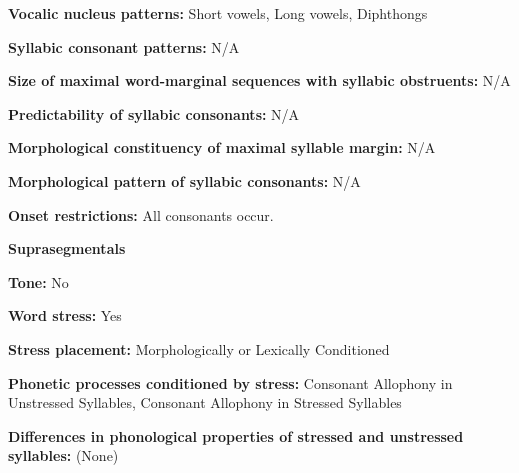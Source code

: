 \begin{styleBody}
\textbf{Vocalic nucleus patterns:} Short vowels, Long vowels, Diphthongs
\end{styleBody}

\begin{styleBody}
\textbf{Syllabic consonant patterns:} N/A
\end{styleBody}

\begin{styleBody}
\textbf{Size of maximal word{}-marginal sequences with syllabic obstruents:} N/A
\end{styleBody}

\begin{styleBody}
\textbf{Predictability of syllabic consonants:} N/A
\end{styleBody}

\begin{styleBody}
\textbf{Morphological constituency of maximal syllable margin:} N/A
\end{styleBody}

\begin{styleBody}
\textbf{Morphological pattern of syllabic consonants:} N/A
\end{styleBody}

\begin{styleBody}
\textbf{Onset restrictions: }All consonants occur.
\end{styleBody}

\begin{styleBody}
\textbf{Suprasegmentals}
\end{styleBody}

\begin{styleBody}
\textbf{Tone:} No
\end{styleBody}

\begin{styleBody}
\textbf{Word stress:} Yes
\end{styleBody}

\begin{styleBody}
\textbf{Stress placement:} Morphologically or Lexically Conditioned
\end{styleBody}

\begin{styleBody}
\textbf{Phonetic processes conditioned by stress:} Consonant Allophony in Unstressed Syllables, Consonant Allophony in Stressed Syllables
\end{styleBody}

\begin{styleBody}
\textbf{Differences in phonological properties of stressed and unstressed syllables:} (None)
\end{styleBody}

